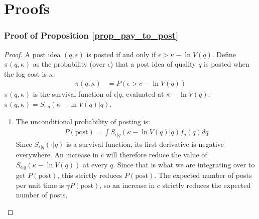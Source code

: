 \section{Proofs}

\subsubsection*{Proof of Proposition \ref{prop_pay_to_post}}

\begin{proof}
A post idea $(q, \epsilon)$ is posted if and only if $\epsilon > \kappa - \ln V(q)$. Define $\pi(q,\kappa)$ as the probability (over $\epsilon$) that a post idea of quality $q$ is posted when the log cost is $\kappa$:
\begin{align*}
\pi(q,\kappa) &= P(\epsilon > c - \ln V(q)) 
\end{align*}
$\pi(q,\kappa)$ is the survival function of $\epsilon|q$, evaluated at $\kappa - \ln V(q)$: $\pi(q,\kappa) = S_{\epsilon|q}(\kappa - \ln V(q) | q)$.
\begin{enumerate}[label=(\roman*)]
\item The unconditional probability of posting is:
\begin{align*}
P(\text{post}) = \int S_{\epsilon|q}(\kappa- \ln V(q)|q)f_q(q)dq
\end{align*}
Since $S_{\epsilon|q}(\cdot|q)$ is a survival function, its first derivative is negative everywhere. An increase in $c$ will therefore reduce the value of $S_{\epsilon|q}(\kappa - \ln V(q))$ at every $q$. Since that is what we are integrating over to get $P(\text{post})$, this strictly reduces $P(\text{post})$. The expected number of posts per unit time is $\gamma P(\text{post})$, so an increase in $c$ strictly reduces the expected number of posts.


\end{enumerate}
\end{proof}

